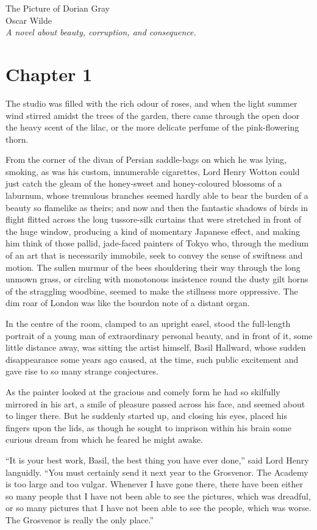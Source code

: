 \documentclass[a5paper,12pt]{book}
\begin{document}
    \begin{titlepage}
        \centering
        {\Huge The Picture of Dorian Gray}\\[1cm]
        {\Large Oscar Wilde}\\[3cm]
        \vfill
        \textit{A novel about beauty, corruption, and consequence.}
        \vfill
    \end{titlepage}

    \setcounter{page}{3}


    \section{Chapter 1}

    The studio was filled with the rich odour of roses, and when the light summer wind stirred amidst the trees of the garden, there came through the open door the heavy scent of the lilac, or the more delicate perfume of the pink-flowering thorn.

    From the corner of the divan of Persian saddle-bags on which he was lying, smoking, as was his custom, innumerable cigarettes, Lord Henry Wotton could just catch the gleam of the honey-sweet and honey-coloured blossoms of a laburnum, whose tremulous branches seemed hardly able to bear the burden of a beauty so flamelike as theirs; and now and then the fantastic shadows of birds in flight flitted across the long tussore-silk curtains that were stretched in front of the huge window, producing a kind of momentary Japanese effect, and making him think of those pallid, jade-faced painters of Tokyo who, through the medium of an art that is necessarily immobile, seek to convey the sense of swiftness and motion. The sullen murmur of the bees shouldering their way through the long unmown grass, or circling with monotonous insistence round the dusty gilt horns of the straggling woodbine, seemed to make the stillness more oppressive. The dim roar of London was like the bourdon note of a distant organ.

    In the centre of the room, clamped to an upright easel, stood the full-length portrait of a young man of extraordinary personal beauty, and in front of it, some little distance away, was sitting the artist himself, Basil Hallward, whose sudden disappearance some years ago caused, at the time, such public excitement and gave rise to so many strange conjectures.

    As the painter looked at the gracious and comely form he had so skilfully mirrored in his art, a smile of pleasure passed across his face, and seemed about to linger there. But he suddenly started up, and closing his eyes, placed his fingers upon the lids, as though he sought to imprison within his brain some curious dream from which he feared he might awake.

    “It is your best work, Basil, the best thing you have ever done,” said Lord Henry languidly. “You must certainly send it next year to the Grosvenor. The Academy is too large and too vulgar. Whenever I have gone there, there have been either so many people that I have not been able to see the pictures, which was dreadful, or so many pictures that I have not been able to see the people, which was worse. The Grosvenor is really the only place.”
\end{document}
